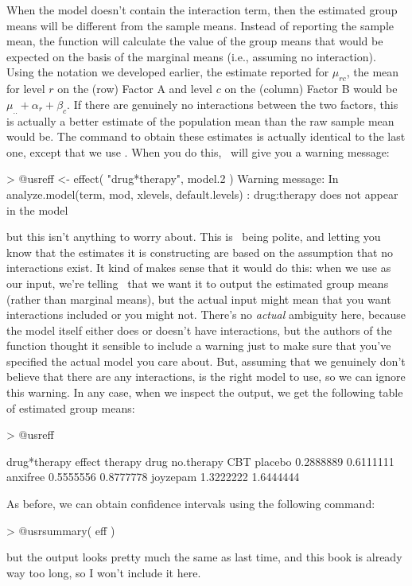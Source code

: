 When the model doesn't contain the interaction term, then the estimated group means will be different from the sample means. Instead of reporting the sample mean, the  function will calculate the value of the group means that would be expected on the basis of the marginal means (i.e., assuming no interaction). Using the notation we developed earlier, the estimate reported for $\mu_{rc}$, the mean for level $r$ on the (row) Factor A and level $c$ on the (column) Factor B would be $\mu_{..} + \alpha_r + \beta_c$. If there are genuinely no interactions between the two factors, this is actually a better estimate of the population mean than the raw sample mean would be. The command to obtain these estimates is actually identical to the last one, except that we use . When you do this, \R\ will give you a warning message:
\begin{rblock1}
> @usr{eff <- effect( "drug*therapy", model.2 )}
Warning message:
In analyze.model(term, mod, xlevels, default.levels) :
  drug:therapy does not appear in the model
\end{rblock1}
but this isn't anything to worry about. This is \R\ being polite, and letting you know that the estimates it is constructing are based on the assumption that no interactions exist. It kind of makes sense that it would do this: when we use  as our input, we're telling \R\ that we want it to output the estimated group means (rather than marginal means), but the actual input  might mean that you want interactions included or you might not. There's no {\it actual} ambiguity here, because the model itself either does or doesn't have interactions, but the authors of the function thought it sensible to include a warning just to make sure that you've specified the actual model you care about. But, assuming that we genuinely don't believe that there are any interactions,  is the right model to use, so we can ignore this warning. In any case, when we inspect the output, we get the following table of estimated group means:
\begin{rblock1}
> @usr{eff}

 drug*therapy effect
          therapy
drug       no.therapy       CBT
  placebo   0.2888889 0.6111111
  anxifree  0.5555556 0.8777778
  joyzepam  1.3222222 1.6444444
\end{rblock1} 
As before, we can obtain confidence intervals using the following command: 
\begin{rblock1}
> @usr{summary( eff )}
\end{rblock1}
but the output looks pretty much the same as last time, and this book is already way too long, so I won't include it here.


